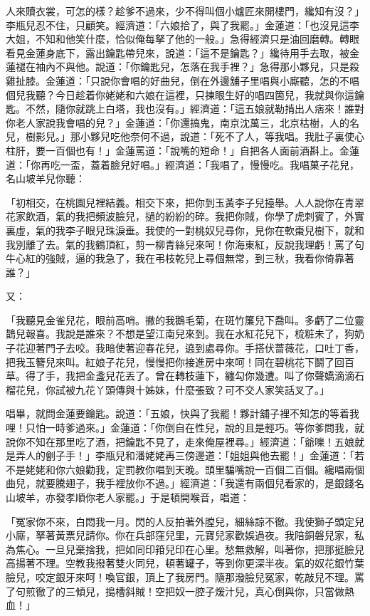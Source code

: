 \begin{showcontents}{}
人來贖衣裳，可怎的樣？趁爹不過來，少不得叫個小爐匠來開樓門，纔知有沒？」李瓶兒忍不住，只顧笑。經濟道：「六娘拾了，與了我罷。」金蓮道：「也沒見這李大姐，不知和他笑什麼，恰似俺每拏了他的一般。」急得經濟只是油回磨轉。轉眼看見金蓮身底下，露出鑰匙帶兒來，說道：「這不是鑰匙？」纔待用手去取，被金蓮褪在袖內不與他。說道：「你鑰匙兒，怎落在我手裡？」急得那小夥兒，只是殺雞扯膝。金蓮道：「只說你會唱的好曲兒，倒在外邊舖子里唱與小廝聽，怎的不唱個兒我聽？今日趁着你姥姥和六娘在這裡，只揀眼生好的唱四箇兒，我就與你這鑰匙。不然，隨你就跳上白塔，我也沒有。」經濟道：「這五娘就勒掯出人痞來！誰對你老人家說我會唱的兒？」金蓮道：「你還搞鬼，南京沈萬三，北京枯樹，人的名兒，樹影兒。」那小夥兒吃他奈何不過，說道：「死不了人，等我唱。我肚子裏使心柱肝，要一百個也有！」金蓮罵道：「說嘴的短命！」自把各人面前酒斟上。金蓮道：「你再吃一盃，蓋着臉兒好唱。」經濟道：「我唱了，慢慢吃。我唱菓子花兒，名山坡羊兒你聽：

「初相交，在桃園兒裡結義。相交下來，把你到玉黃李子兒擡舉。人人說你在青翠花家飲酒，氣的我把頻波臉兒，撾的紛紛的碎。我把你賊，你學了虎刺賓了，外實裏虛，氣的我李子眼兒珠淚垂。我使的一對桃奴兒尋你，見你在軟棗兒樹下，就和我別離了去。氣的我鶴頂紅，剪一柳青絲兒來呵！你海東紅，反說我理虧！罵了句牛心紅的強賊，逼的我急了，我在弔枝乾兒上尋個無常，到三秋，我看你倚靠著誰？」

又：

「我聽見金雀兒花，眼前高哨。撇的我鵝毛菊，在斑竹簾兒下喬叫。多虧了二位靈鵲兒報喜。我說是誰來？不想是望江南兒來到。我在水紅花兒下，梳粧未了，狗奶子花迎著門子去咬。我暗使著迎春花兒，遶到處尋你。手搭伏薔薇花，口吐丁香，把我玉簪兒來叫。紅娘子花兒，慢慢把你接進房中來呵！同在碧桃花下鬬了回百草。得了手，我把金盞兒花丟了。曾在轉枝蓮下，纏勾你幾遭。叫了你聲嬌滴滴石榴花兒，你試被九花丫頭傳與十姊妹，什麼張致？可不交人家笑話叉了。」

唱畢，就問金蓮要鑰匙。說道：「五娘，快與了我罷！夥計舖子裡不知怎的等着我哩！只怕一時爹過來。」金蓮道：「你倒自在性兒，說的且是輕巧。等你爹問我，就說你不知在那里吃了酒，把鑰匙不見了，走來俺屋裡尋。」經濟道：「爺嚛！五娘就是弄人的劊子手！」李瓶兒和潘姥姥再三傍邊道：「姐姐與他去罷！」金蓮道：「若不是姥姥和你六娘勸我，定罰教你唱到天晚。頭里騙嘴說一百個二百個。纔唱兩個曲兒，就要騰翅子，我手裡放你不過。」經濟道：「我還有兩個兒看家的，是銀錢名山坡羊，亦發孝順你老人家罷。」于是頓開喉音，唱道：

「冤家你不來，白悶我一月。閃的人反拍著外膛兒，細絲諒不徹。我使獅子頭定兒小廝，拏著黃票兒請你。你在兵部窪兒里，元寶兒家歡娛過夜。我陪銅磐兒家，私為焦心。一旦兒棄捨我，把如同印箝兒印在心里。愁無救解，叫著你，把那挺臉兒高揚著不理。空教我撥著雙火同兒，頓著罐子，等到你更深半夜。氣的奴花銀竹葉臉兒，咬定銀牙來呵！喚官銀，頂上了我房門。隨那潑臉兒冤家，乾敲兒不理。罵了句煎徹了的三傾兒，搗槽斜賊！空把奴一腔子煖汁兒，真心倒與你，只當做熱血！」


\end{showcontents}
